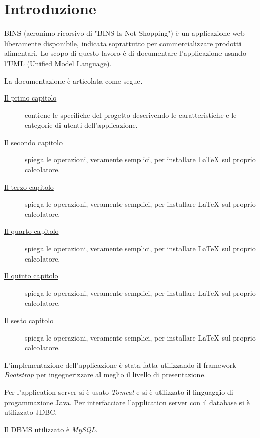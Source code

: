 
\cleardoublepage
{}

\chapter*{Introduzione}

BINS (acronimo ricorsivo di "BINS Is Not Shopping") è un applicazione web liberamente disponibile, indicata soprattutto per commercializzare prodotti alimentari. Lo scopo di questo lavoro è di documentare l'applicazione usando l'UML (Unified Model Language).

La documentazione è articolata come segue.

\begin{description}
	
	\item[{\hyperref[cap:specifiche-progetto]{Il primo capitolo}}]
	contiene le specifiche del progetto descrivendo le caratteristiche e le categorie di utenti dell'applicazione.
	
	\item[{\hyperref[cap:diagramma]{Il secondo capitolo}}]
	spiega le operazioni, veramente semplici, per installare \LaTeX{} sul proprio calcolatore.
	
	\item[{\hyperref[cap:modello-relazionale]{Il terzo capitolo}}]
	spiega le operazioni, veramente semplici, per installare \LaTeX{} sul proprio calcolatore.
	
	\item[{\hyperref[cap:normalizzazione]{Il quarto capitolo}}]
	spiega le operazioni, veramente semplici, per installare \LaTeX{} sul proprio calcolatore.
	
	\item[{\hyperref[cap:codice-SQL]{Il quinto capitolo}}]
	spiega le operazioni, veramente semplici, per installare \LaTeX{} sul proprio calcolatore.
	
	\item[{\hyperref[cap:interfaccia-grafica]{Il sesto capitolo}}]
	spiega le operazioni, veramente semplici, per installare \LaTeX{} sul proprio calcolatore.
	
\end{description}

L'implementazione dell'applicazione è stata fatta utilizzando il framework \emph{Bootstrap} per ingegnerizzare al meglio il livello di presentazione.

Per l'application server si è usato \emph{Tomcat} e si è utilizzato il linguaggio di progammazione Java.
 Per interfacciare l'application server con il database si è utilizzato JDBC.
 
Il DBMS utilizzato è \emph{MySQL}.